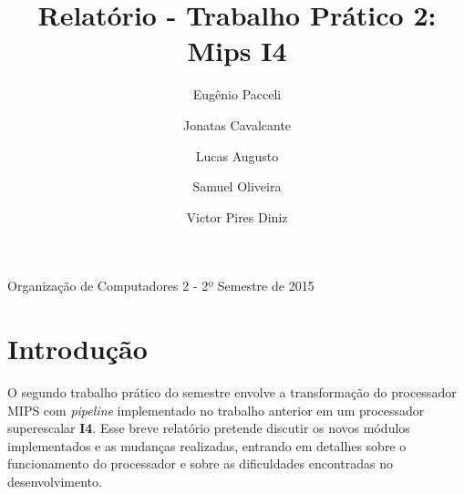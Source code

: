 \documentclass[10pt,a4paper]{article}
\title{Relatório - Trabalho Prático 2: Mips I4}
\author{
    Eugênio Pacceli
    \and
    Jonatas Cavalcante
    \and
    Lucas Augusto
    \and
    Samuel Oliveira
    \and
    Victor Pires Diniz
}
\numberwithin{equation}{section}
\begin{document}
\maketitle
\begin{center}
Organização de Computadores 2 - 2º Semestre de 2015
\end{center}

\section{Introdução}

O segundo trabalho prático do semestre envolve a transformação do processador MIPS com \emph{pipeline} implementado no trabalho anterior em um processador superescalar \textbf{I4}. Esse breve relatório pretende discutir os novos módulos implementados e as mudanças realizadas, entrando em detalhes sobre o funcionamento do processador e sobre as dificuldades encontradas no desenvolvimento.
\end{document}
